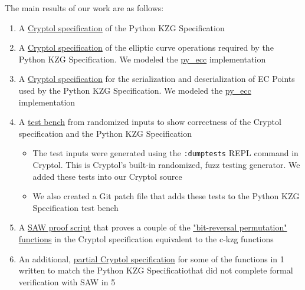 \documentclass[12pt]{galois-whitepaper}
\begin{document}
The main results of our work are as follows:
\begin{enumerate}
    \item A \href{https://github.com/GaloisInc/ckzg-eip-4844-verification/tree/main/spec/Spec}{Cryptol specification}
          of the Python KZG Specification
    \item A \href{https://github.com/GaloisInc/ckzg-eip-4844-verification/tree/main/spec/Spec/BlsEC}{Cryptol specification}
          of the elliptic curve operations required by the Python KZG Specification.
          We modeled the \href{https://github.com/ethereum/py_ecc}{py\_ecc} implementation
    \item A \href{https://github.com/GaloisInc/ckzg-eip-4844-verification/blob/main/spec/Spec/BlsSerde.cry}{Cryptol specification}
          for the serialization and deserialization of EC Points used by the Python KZG Specification.
          We modeled the \href{https://github.com/ethereum/py_ecc}{py\_ecc} implementation
    \item A \href{https://github.com/GaloisInc/ckzg-eip-4844-verification/tree/main/spec/TestVectors}{test bench}
          from randomized inputs to show correctness of the Cryptol specification and the Python KZG Specification
          \begin{itemize}
                \item The test inputs were generated using the \texttt{:dumptests} REPL command in Cryptol.
                This is Cryptol's built-in randomized, fuzz testing generator. We added these tests into our Cryptol source
                \item We also created a Git patch file that adds these tests to the Python KZG Specification test bench
          \end{itemize}
    \item A \href{https://github.com/GaloisInc/ckzg-eip-4844-verification/tree/main/proof}{SAW proof script}
          that proves a couple of the \href{https://github.com/ethereum/consensus-specs/blob/68d32accf945a84f69d4c779cb6c71223a311eac/specs/deneb/polynomial-commitments.md\#bit-reversal-permutation}
          {"bit-reversal permutation" functions} in the Cryptol specification equivalent to the c-kzg functions
    \item An additional, \href{https://github.com/GaloisInc/ckzg-eip-4844-verification/tree/main/spec/LLVM}{partial Cryptol specification}
          for some of the functions in 1 written to match the Python KZG Specificatiothat did not complete
          formal verification with SAW in 5
\end{enumerate}
\end{document}
